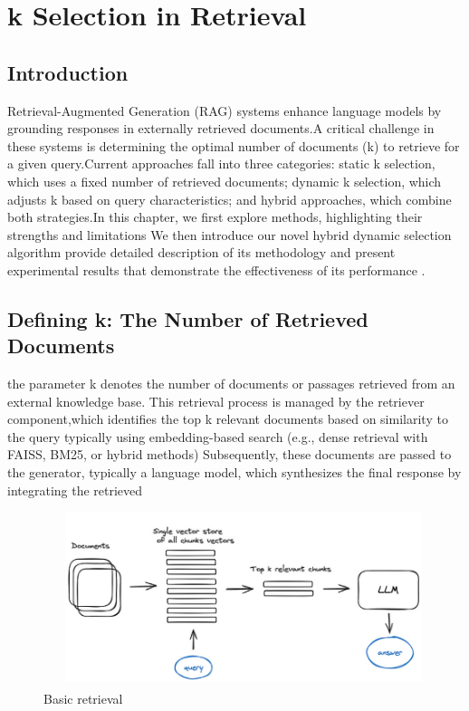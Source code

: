 \chapter{k Selection in Retrieval}
\section{Introduction}
Retrieval-Augmented Generation (RAG) systems enhance language models by grounding responses in externally retrieved documents.A critical challenge in these systems is determining the optimal number of documents (k) to retrieve for a given query.Current approaches fall into three categories: static k selection, which uses a fixed number of retrieved documents; dynamic k selection, which adjusts k based on query  characteristics; and hybrid approaches, which combine both strategies.In this chapter, we first explore methods, highlighting their strengths and limitations We then introduce our novel hybrid dynamic selection algorithm provide detailed description of its methodology and present experimental results that demonstrate the effectiveness of its performance . 
\section{Defining k: The Number of Retrieved Documents}
the parameter k denotes the number of documents or passages retrieved from an external knowledge base. This retrieval process is managed by the retriever component\cite{pareto2024rag},which identifies the top k relevant documents based on similarity to the query typically using embedding-based search\cite{Rossi_2024} (e.g., dense retrieval with FAISS, BM25, or hybrid methods) Subsequently, these documents are passed to the generator, typically a language model, which synthesizes the final response by integrating the retrieved 
\begin{figure}[h]
	\centering
	\includegraphics[width=0.9\linewidth]{Figures/topk.png}
	\caption{Basic retrieval}
	\label{rag_retrival.png}
	
\end{figure}
\newline
